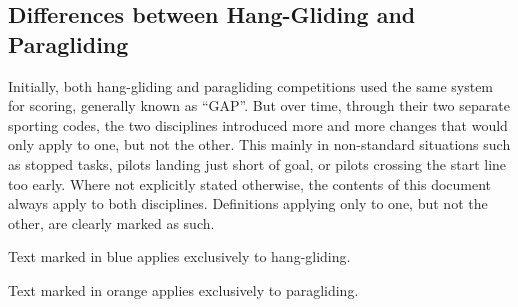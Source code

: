 \documentclass[gap.tex]{subfiles}
\begin{document}
\subsection{Differences between Hang-Gliding and Paragliding}
Initially, both hang-gliding and paragliding competitions used the same system
for scoring, generally known as “GAP”. But over time, through their two
separate sporting codes, the two disciplines introduced more and more changes
that would only apply to one, but not the other. This mainly in non-standard
situations such as stopped tasks, pilots landing just short of goal, or pilots
crossing the start line too early. Where not explicitly stated otherwise, the
contents of this document always apply to both disciplines. Definitions
applying only to one, but not the other, are clearly marked as such.

\begin{hg}
Text marked in blue applies exclusively to hang-gliding.
\end{hg}

\begin{pg}
Text marked in orange applies exclusively to paragliding.
\end{pg}
\end{document}
